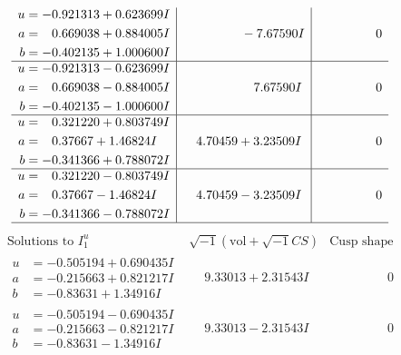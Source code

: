 \documentclass[1p]{elsarticle_modified}
\theoremstyle{definition}
\newcommand{\I}{\sqrt{-1}}
\begin{document}
$$\begin{array}{c|c|c}
\begin{aligned}
u &= -0.921313 + 0.623699 I \\
a &= \phantom{-}0.669038 + 0.884005 I \\
b &= -0.402135 + 1.000600 I\end{aligned}
 & \phantom{-0.000000 } -7.67590 I & \phantom{-0.000000 } 0 \\ \hline\begin{aligned}
u &= -0.921313 - 0.623699 I \\
a &= \phantom{-}0.669038 - 0.884005 I \\
b &= -0.402135 - 1.000600 I\end{aligned}
 & \phantom{-0.000000 -}7.67590 I & \phantom{-0.000000 } 0 \\ \hline\begin{aligned}
u &= \phantom{-}0.321220 + 0.803749 I \\
a &= \phantom{-}0.37667 + 1.46824 I \\
b &= -0.341366 + 0.788072 I\end{aligned}
 & \phantom{-}4.70459 + 3.23509 I & \phantom{-0.000000 } 0 \\ \hline\begin{aligned}
u &= \phantom{-}0.321220 - 0.803749 I \\
a &= \phantom{-}0.37667 - 1.46824 I \\
b &= -0.341366 - 0.788072 I\end{aligned}
 & \phantom{-}4.70459 - 3.23509 I & \phantom{-0.000000 } 0\\
 \hline 
 \end{array}$$\newpage$$\begin{array}{c|c|c}  
\text{Solutions to }I^u_{1}& \I (\text{vol} + \sqrt{-1}CS) & \text{Cusp shape}\\
 \hline 
\begin{aligned}
u &= -0.505194 + 0.690435 I \\
a &= -0.215663 + 0.821217 I \\
b &= -0.83631 + 1.34916 I\end{aligned}
 & \phantom{-}9.33013 + 2.31543 I & \phantom{-0.000000 } 0 \\ \hline\begin{aligned}
u &= -0.505194 - 0.690435 I \\
a &= -0.215663 - 0.821217 I \\
b &= -0.83631 - 1.34916 I\end{aligned}
 & \phantom{-}9.33013 - 2.31543 I & \phantom{-0.000000 } 0 \\ \hline\begin{aligned}

\end{aligned}
\end{array}$$
\end{document}
